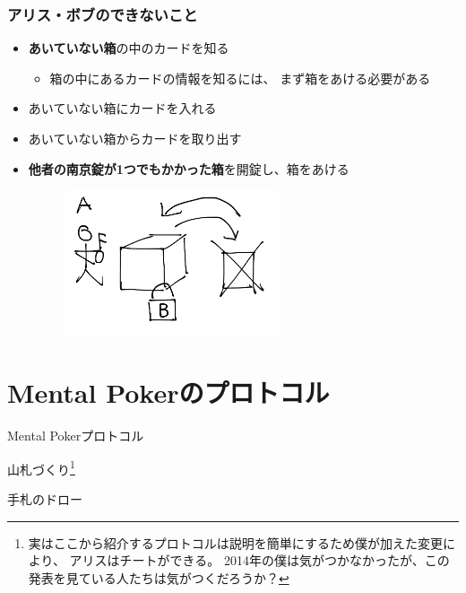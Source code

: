 \begin{frame}
  \frametitle{アリス・ボブのできないこと}

  \pause
  \begin{itemize}
    \item<+-> \textbf{あいていない箱}の中のカードを知る
    \begin{itemize}
      \item 箱の中にあるカードの情報を知るには、
      まず箱をあける必要がある
    \end{itemize}
   
    \item<+-> あいていない箱にカードを入れる
    \item<+-> あいていない箱からカードを取り出す
    
    \item<+-> \textbf{他者の南京錠が1つでもかかった箱}を開錠し、箱をあける
    \begin{figure}[h]
      \includegraphics[width=0.6\textwidth]{img/we_can_not.png}
    \end{figure}
  \end{itemize}
\end{frame}

\section{Mental Pokerのプロトコル}

\begin{frame}

  \centering
  {\huge Mental Pokerプロトコル}

  \vspace{1em}

  \begin{itemize}
    \item 山札づくり\footnote[frame]{%
      実はここから紹介するプロトコルは説明を簡単にするため僕が加えた変更により、
      アリスはチートができる。
      2014年の僕は気がつかなかったが、この発表を見ている人たちは気がつくだろうか？
    }

    {\color{gray!50}
      \item 手札のドロー
    }
  \end{itemize}
\end{frame}

